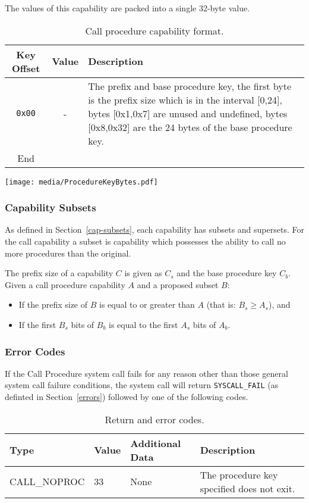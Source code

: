 \documentclass[english,a4paper]{article}
\let\oldparagraph\subsubsection
\renewcommand{\subsubsection}[1]{\oldparagraph{#1}\mbox{}}
\begin{document}
The values of this capability are packed into a single 32-byte value.

\begin{table}[H]
  \caption{Call procedure capability format.}
  \centering{}%
  \begin{tabularx}{\textwidth}{c|c|X}
    \hline
    Key Offset & Value & Description\tabularnewline
    \hline
    \hline
    \texttt{0x00} & -    & The prefix and base procedure key, the first byte is the prefix
                 size which is in the interval [0,24], bytes [0x1,0x7] are
                 unused and undefined, bytes [0x8,0x32] are the 24 bytes of the
                 base procedure key. \tabularnewline
    \hline
    End &  \tabularnewline
    \hline
  \end{tabularx}
\end{table}

\texttt{[image: media/ProcedureKeyBytes.pdf]}

\subsubsection{Capability Subsets}
As defined in Section~\ref{cap-subsets}, each capability has subsets and
supersets. For the call capability a subset is capability which possesses the
ability to call no more procedures than the original.

The prefix size of a capability $C$ is given as $C_s$ and the base procedure key
$C_b$. Given a call procedure capability $A$ and a proposed subset $B$:
\begin{itemize}
  \item If the prefix size of $B$ is equal to or greater than $A$ (that is: $B_s
  \geq A_s$), and
  \item If the first $B_s$ bits of $B_b$ is equal to the first $A_s$ bits of
  $A_b$.
\end{itemize}

\subsubsection{Error Codes}
If the Call Procedure system call fails for any reason other than those
general system call failure conditions, the system call will return
\texttt{SYSCALL\_FAIL} (as definted in Section~\ref{errors}) followed by one of
the following codes.

\begin{table}[H]
  \caption{Return and error codes.}
  \centering{}%
  \begin{tabular}{l|l|p{}|p{}}
    \hline
    Type & Value & Additional Data & Description\tabularnewline
    \hline
    \hline
    CALL\_NOPROC  & 33 & None & The procedure key specified does not exit.
      \tabularnewline
    \hline
  \end{tabular}
\end{table}
\end{document}
